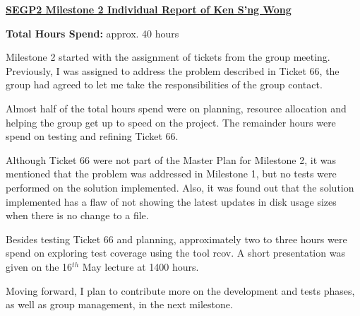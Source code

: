 \documentclass{letter}
\begin{document}
{\large \textbf{\underline{SEGP2 Milestone 2 Individual Report of Ken S'ng Wong}}}

\textbf{Total Hours Spend:} approx. 40 hours

Milestone 2 started with the assignment of tickets from the group meeting. Previously, I was assigned to address the problem described in Ticket 66, the group had agreed to let me take the responsibilities of the group contact. 

Almost half of the total hours spend were on planning, resource allocation and helping the group get up to speed on the project. The remainder hours were spend on testing and refining Ticket 66. 

Although Ticket 66 were not part of the Master Plan for Milestone 2, it was mentioned that the problem was addressed in Milestone 1, but no tests were performed on the solution implemented. Also, it was found out that the solution implemented has a flaw of not showing the latest updates in disk usage sizes when there is no change to a file. 

Besides testing Ticket 66 and planning, approximately two to three hours were spend on exploring test coverage using the tool rcov. A short presentation was given on the 16$^{th}$ May lecture at 1400 hours. 

Moving forward, I plan to contribute more on the development and tests phases, as well as group management, in the next milestone. 
\end{document}
